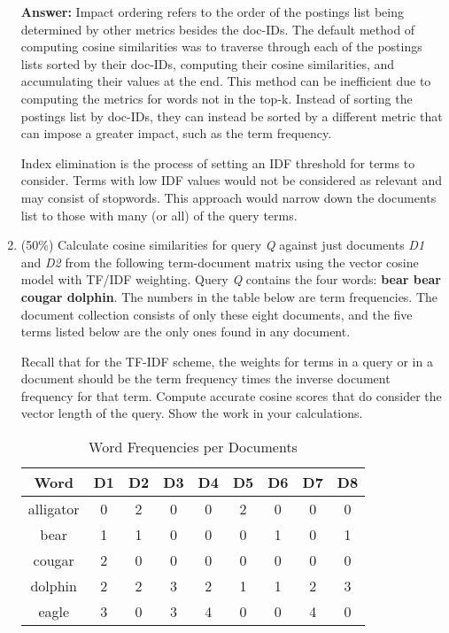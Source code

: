\documentclass[11pt]{article}
\begin{document}
\begin{enumerate}
        \textbf{Answer:} Impact ordering refers to the order of the postings list being determined by other metrics besides the doc-IDs. The default method of computing cosine similarities was to traverse through each of the postings lists sorted by their doc-IDs, computing their cosine similarities, and accumulating their values at the end. This method can be inefficient due to computing the metrics for words not in the top-k. Instead of sorting the postings list by doc-IDs, they can instead be sorted by a different metric that can impose a greater impact, such as the term frequency.

        Index elimination is the process of setting an IDF threshold for terms to consider. Terms with low IDF values would not be considered as relevant and may consist of stopwords. This approach would narrow down the documents list to those with many (or all) of the query terms.

        \item (50\%) Calculate cosine similarities for query \textit{Q} against just documents \textit{D1} and \textit{D2} from the following term-document matrix using the vector cosine model with TF/IDF weighting. Query \textit{Q} contains the four words: \textbf{bear bear cougar dolphin}. The numbers in the table below are term frequencies. The document collection consists of only these eight documents, and the five terms listed below are the only ones found in any document.

        Recall that for the TF-IDF scheme, the weights for terms in a query or in a document should be the term frequency times the inverse document frequency for that term. Compute accurate cosine scores that do consider the vector length of the query. Show the work in your calculations.

        \begin{table}[htbp]
            \begin{center}
                \caption{Word Frequencies per Documents}
                \begin{tabular}{| c | c | c | c | c | c | c | c | c |}
                \hline
                \textbf{Word} & \textbf{D1} & \textbf{D2} & D3 & D4 & D5 & D6 & D7 & D8  \\
                \hline
                alligator   & 0 & 2 & 0 & 0 & 2 & 0 & 0 & 0 \\
                \hline
                bear        & 1 & 1 & 0 & 0 & 0 & 1 & 0 & 1 \\
                \hline
                cougar      & 2 & 0 & 0 & 0 & 0 & 0 & 0 & 0 \\
                \hline
                dolphin     & 2 & 2 & 3 & 2 & 1 & 1 & 2 & 3 \\
                \hline
                eagle       & 3 & 0 & 3 & 4 & 0 & 0 & 4 & 0 \\
                \hline
                \end{tabular}
            \end{center}
        \end{table}


\end{enumerate}
\end{document}
